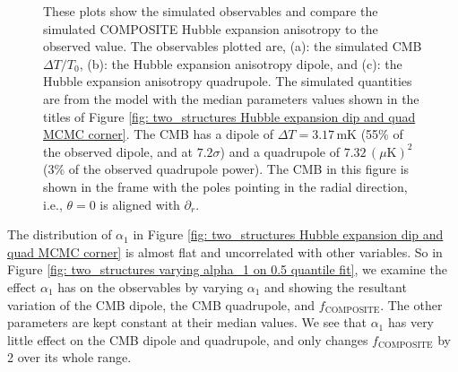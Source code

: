 \documentclass[a4paper,12pt]{report}
\begin{document}
\begin{figure}[tb]
\begin{subfigure}[b]{105mm}
        \caption{}
    \end{subfigure}
    \caption{These plots show the simulated observables and compare the simulated COMPOSITE Hubble expansion anisotropy to the observed value. The observables plotted are, (a): the simulated CMB $\Delta T / T_0$, (b): the Hubble expansion anisotropy dipole, and (c): the Hubble expansion anisotropy quadrupole. The simulated quantities are from the model with the median parameters values shown in the titles of Figure \ref{fig: two_structures Hubble expansion dip and quad MCMC corner}. The CMB has a dipole of $\Delta T = 3.17\,$mK (55\% of the observed dipole, and at $7.2 \sigma$) and a quadrupole of $7.32\, (\mu \text{K})^2$ (3\% of the observed quadrupole power). The CMB in this figure is shown in the frame with the poles pointing in the radial direction, i.e., $\theta=0$ is aligned with $\partial_r$.}
    \label{fig: two_structures COMP MCMC 0.5 quantile observables}
\end{figure}

The distribution of $\alpha_1$ in Figure \ref{fig: two_structures Hubble expansion dip and quad MCMC corner} is almost flat and uncorrelated with other variables. So in Figure \ref{fig: two_structures varying alpha_1 on 0.5 quantile fit}, we examine the effect $\alpha_1$ has on the observables by varying $\alpha_1$ and showing the resultant variation of the CMB dipole, the CMB quadrupole, and $f_\text{COMPOSITE}$. The other parameters are kept constant at their median values. We see that $\alpha_1$ has very little effect on the CMB dipole and quadrupole, and only changes $f_\text{COMPOSITE}$ by 2 over its whole range.
\end{document}
